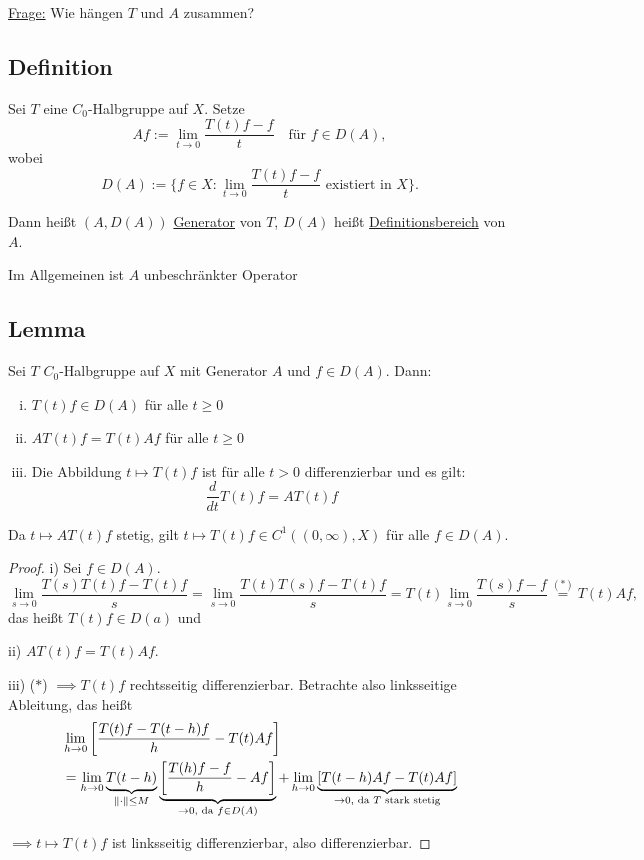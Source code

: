 \underline{Frage:} Wie hängen $T$ und $A$ zusammen?

\subsection{Definition}

Sei $T$ eine $C_0$-Halbgruppe auf $X$. Setze
$$
Af := \lim_{t \to 0} \frac{T(t) f - f}{t} \quad\text{für } f \in D(A),
$$
wobei
$$
D(A) := \{ f \in X \colon \lim_{t \to 0} \frac{T(t) f - f}{t} \text{ existiert in } X\}.
$$

Dann heißt $(A, D(A))$ \underline{Generator} von $T$, $D(A)$ heißt \underline{Definitionsbereich} von $A$.

\begin{bem}
  Im Allgemeinen ist $A$ unbeschränkter Operator
\end{bem}

\subsection{Lemma}

Sei $T$ $C_0$-Halbgruppe auf $X$ mit Generator $A$ und $f \in D(A)$. Dann:
\begin{enumerate}[i)]
  \item $T(t) f \in D(A)$ für alle $t \geq 0$
  \item $AT(t) f = T(t) A f$ für alle $t \geq 0$
  \item Die Abbildung $t \mapsto T(t) f $ ist für alle $t > 0$ differenzierbar und es gilt:
  $$
    \frac{d}{dt} T(t) f = A T(t) f 
  $$
\end{enumerate}

\begin{bem}
  Da $t \mapsto AT(t) f$ stetig, gilt $t \mapsto T(t) f \in C^1((0,\infty), X)$ für alle $f \in D(A)$.
\end{bem}

\begin{proof}
i) Sei $f \in D(A)$.
$$
\lim_{s \to 0} \frac{T(s)T(t) f - T(t) f}{s} = \lim_{s \to 0} \frac{T(t)T(s) f - T(t) f}{s} = T(t) \lim_{s \to 0} \frac{T(s)f - f}{s} \overset{(\ast)}{=} T(t)A f,
$$
das heißt $T(t) f \in D(a)$ und

ii) $AT(t) f = T(t) Af$.

iii) ($\ast$) $\implies T(t) f$ rechtsseitig differenzierbar. Betrachte also linksseitige Ableitung, das heißt
\begin{align*}
&\lim_{h \to 0} \left[\frac{T(t)f - T(t - h)f}{h} - T(t) Af \right] \\
&= \lim_{h \to 0} \underbrace{T(t - h)}_{\lVert \cdot \rVert \leq M} \underbrace{\left[\frac{T(h) f - f}{h} - Af \right]}_{\to 0, \text{ da } f \in D(A)} 
+ \lim_{h \to 0} \underbrace{\left[ T(t - h) Af - T(t) Af \right]}_{\to 0, \text{ da } T \text{ stark stetig}}
\end{align*}

$\implies t \mapsto T(t) f$ ist linksseitig differenzierbar, also differenzierbar.
\end{proof}

